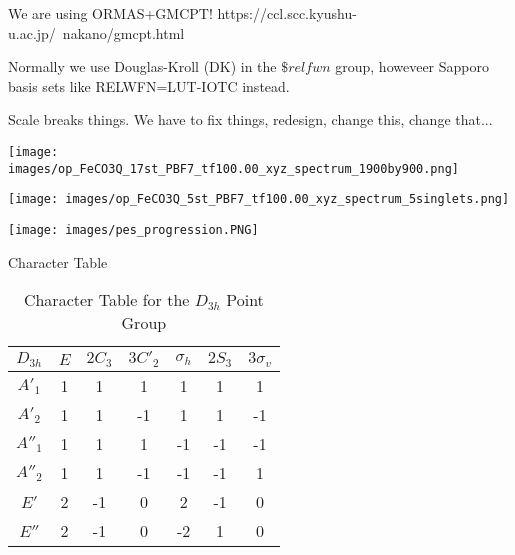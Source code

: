 \documentclass[letterpaper, 12pt, oneside]{report}
\begin{document}
    We are using ORMAS+GMCPT!
    https://ccl.scc.kyushu-u.ac.jp/~nakano/gmcpt.html

    Normally we use Douglas-Kroll (DK) in the $\$relfwn$ group, howeveer Sapporo basis sets like RELWFN=LUT-IOTC instead.
    
    Scale breaks things. We have to fix things, redesign, change this, change that...

    
\texttt{[image: images/op\_FeCO3Q\_17st\_PBF7\_tf100.00\_xyz\_spectrum\_1900by900.png]}

\texttt{[image: images/op\_FeCO3Q\_5st\_PBF7\_tf100.00\_xyz\_spectrum\_5singlets.png]}

\texttt{[image: images/pes\_progression.PNG]}

 Character Table
\begin{table}[h]
\centering
\caption{Character Table for the $D_{3h}$ Point Group}
\begin{tabular}{c|cccccc}
\hline
$D_{3h}$ & $E$ & $2C_3$ & $3C'_2$ & $\sigma_h$ & $2S_3$ & $3\sigma_v$ \\
\hline
$A'_1$   & 1 &  1 &  1 &  1 &  1 &  1 \\
$A'_2$   & 1 &  1 & -1 &  1 &  1 & -1 \\
$A''_1$  & 1 &  1 &  1 & -1 & -1 & -1 \\
$A''_2$  & 1 &  1 & -1 & -1 & -1 &  1 \\
$E'$     & 2 & -1 &  0 &  2 & -1 &  0 \\
$E''$    & 2 & -1 &  0 & -2 &  1 &  0 \\
\hline
\end{tabular}
\label{tab:character_table_d3h}
\end{table}
\end{document}
